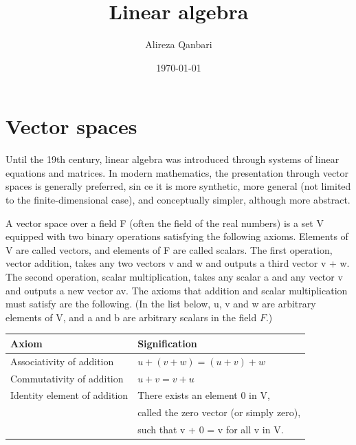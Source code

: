 \documentclass[a4paper,12pt]{article}
\begin{document}
    \title{Linear algebra}
    \author{Alireza Qanbari}
    \date{\today}

    \maketitle


    \tableofcontents
    \newpage


    \section{Vector spaces}



    Until the 19th century, linear algebra was introduced through systems
    of linear equations and matrices. In modern mathematics, the presentation
    through
    vector spaces is generally preferred, sin
    ce it is more synthetic, more general (not limited to the finite-dimensional case),
    and conceptually simpler, although more abstract.

    A vector space over a field F (often the field of the real numbers) is a set V equipped with
    two binary operations satisfying the following axioms. Elements of V are called vectors, and elements of F are
    called scalars. The first operation, vector addition, takes any two vectors v and w and outputs a third vector
    v + w. The second operation, scalar multiplication, takes any scalar a and any vector v and outputs a new vector
    av. The axioms that addition and scalar multiplication must satisfy are the following. (In the list below, u, v
    and w are arbitrary elements of V, and a and b are arbitrary scalars in the field $F$.)\cite{2}


    \begin{center}


        \begin{tabular}{||l || l||}
            \hline
            Axiom & Signification \\
            \hline
            Associativity of addition &  $u+(v+w)=(u+v)+w$  \\
            \hline
            Commutativity of addition & $u+v=v+u$ \\
            \hline
            Identity element of addition & There exists an element 0 in V,\\
            &called the zero vector (or simply zero),\\
            & such that v + 0 = v for all v in V. \\
            \hline


        \end{tabular}
    \end{center}
\end{document}
